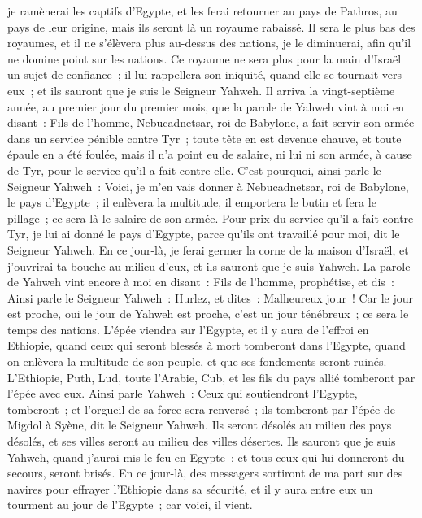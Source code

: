 \begin{multicols}{2}
je ramènerai les captifs d'Egypte, et les ferai retourner au pays de Pathros, au pays de leur origine, mais ils seront là un royaume rabaissé.
Il sera le plus bas des royaumes, et il ne s'élèvera plus au-dessus des nations, je le diminuerai, afin qu'il ne domine point sur les nations.
Ce royaume ne sera plus pour la main d'Israël un sujet de confiance~; il lui rappellera son iniquité, quand elle se tournait vers eux~; et ils sauront que je suis le Seigneur Yahweh.
Il arriva la vingt-septième année, au premier jour du premier mois, que la parole de Yahweh vint à moi en disant~:
Fils de l'homme, Nebucadnetsar, roi de Babylone, a fait servir son armée dans un service pénible contre Tyr~; toute tête en est devenue chauve, et toute épaule en a été foulée, mais il n'a point eu de salaire, ni lui ni son armée, à cause de Tyr, pour le service qu'il a fait contre elle.
C'est pourquoi, ainsi parle le Seigneur Yahweh~: Voici, je m'en vais donner à Nebucadnetsar, roi de Babylone, le pays d'Egypte~; il enlèvera la multitude, il emportera le butin et fera le pillage~; ce sera là le salaire de son armée.
Pour prix du service qu'il a fait contre Tyr, je lui ai donné le pays d'Egypte, parce qu'ils ont travaillé pour moi, dit le Seigneur Yahweh.
En ce jour-là, je ferai germer la corne de la maison d'Israël, et j'ouvrirai ta bouche au milieu d'eux, et ils sauront que je suis Yahweh.
\VerseOne{}La parole de Yahweh vint encore à moi en disant~:
Fils de l'homme, prophétise, et dis~: Ainsi parle le Seigneur Yahweh~: Hurlez, et dites~: Malheureux jour~!
Car le jour est proche, oui le jour de Yahweh est proche, c'est un jour ténébreux~; ce sera le temps des nations.
L'épée viendra sur l'Egypte, et il y aura de l'effroi en Ethiopie, quand ceux qui seront blessés à mort tomberont dans l'Egypte, quand on enlèvera la multitude de son peuple, et que ses fondements seront ruinés.
L'Ethiopie, Puth, Lud, toute l'Arabie, Cub, et les fils du pays allié tomberont par l'épée avec eux.
Ainsi parle Yahweh~: Ceux qui soutiendront l'Egypte, tomberont~; et l'orgueil de sa force sera renversé~; ils tomberont par l'épée de Migdol à Syène, dit le Seigneur Yahweh.
Ils seront désolés au milieu des pays désolés, et ses villes seront au milieu des villes désertes.
Ils sauront que je suis Yahweh, quand j'aurai mis le feu en Egypte~; et tous ceux qui lui donneront du secours, seront brisés.
En ce jour-là, des messagers sortiront de ma part sur des navires pour effrayer l'Ethiopie dans sa sécurité, et il y aura entre eux un tourment au jour de l'Egypte~; car voici, il vient.

\end{multicols}
